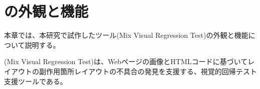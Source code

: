 \chapter{ \toolName の外観と機能}\label{cha:Function}
本章では、本研究で試作したツール\toolName (Mix Visual Regression Test)の外観と機能について説明する。
\par
\toolName (Mix Visual Regression Test)は、Webページの画像とHTMLコードに基づいてレイアウトの副作用箇所レイアウトの不具合の発見を支援する、視覚的回帰テスト支援ツールである。
\par

